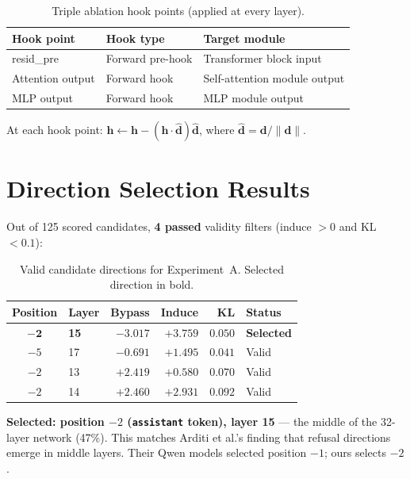 \documentclass[11pt,a4paper]{article}
\begin{document}
\begin{table}[H]\centering
\caption{Triple ablation hook points (applied at every layer).}
\begin{tabular}{lll}
\toprule
\textbf{Hook point} & \textbf{Hook type} & \textbf{Target module} \\
\midrule
resid\_pre & Forward pre-hook & Transformer block input \\
Attention output & Forward hook & Self-attention module output \\
MLP output & Forward hook & MLP module output \\
\bottomrule
\end{tabular}
\end{table}

At each hook point: $\mathbf{h} \leftarrow \mathbf{h} - (\mathbf{h} \cdot \hat{\mathbf{d}}) \hat{\mathbf{d}}$, where $\hat{\mathbf{d}} = \mathbf{d}/\|\mathbf{d}\|$.

\section{Direction Selection Results}

Out of 125 scored candidates, \textbf{4 passed} validity filters (induce $> 0$ and KL $< 0.1$):

\begin{table}[H]\centering
\caption{Valid candidate directions for Experiment~A. Selected direction in bold.}
\begin{tabular}{clrrrl}
\toprule
\textbf{Position} & \textbf{Layer} & \textbf{Bypass} & \textbf{Induce} & \textbf{KL} & \textbf{Status} \\
\midrule
$\mathbf{-2}$ & \textbf{15} & $\mathbf{-3.017}$ & $\mathbf{+3.759}$ & $\mathbf{0.050}$ & \textbf{Selected} \\
$-5$ & 17 & $-0.691$ & $+1.495$ & $0.041$ & Valid \\
$-2$ & 13 & $+2.419$ & $+0.580$ & $0.070$ & Valid \\
$-2$ & 14 & $+2.460$ & $+2.931$ & $0.092$ & Valid \\
\bottomrule
\end{tabular}
\end{table}

\textbf{Selected: position $-2$ (\texttt{assistant} token), layer 15} --- the middle of the 32-layer network (47\%). This matches Arditi et al.'s finding that refusal directions emerge in middle layers. Their Qwen models selected position $-1$; ours selects $-2$.
\end{document}
